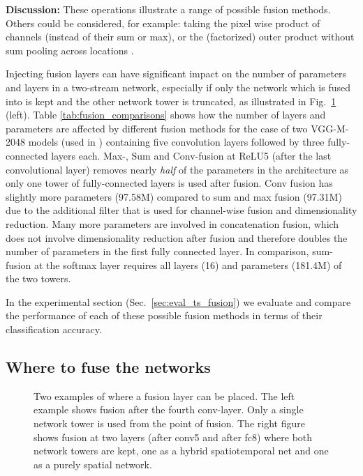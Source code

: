 \documentclass[10pt,twocolumn,letterpaper]{article}
\begin{document}
\textbf{Discussion:} These operations illustrate a range of possible fusion methods. Others could be considered, for example: taking the pixel wise
product of channels (instead of their sum or max), or the (factorized) outer product without sum pooling across locations \cite{Oh15}. 

Injecting fusion layers can have significant impact on the number of parameters
and layers in a two-stream network, especially if only the network
which is fused into is kept and the other network tower is truncated, 
as illustrated in Fig.~\ref{fig:where_to_fuse} (left).
Table \ref{tab:fusion_comparisons} shows how the number of layers and
parameters are affected by different fusion methods for the case of
two VGG-M-2048 models (used in \cite{Simonyan14b}) containing five
convolution layers followed by three fully-connected layers each.
Max-, Sum and Conv-fusion at ReLU5 (after the last convolutional layer)
removes nearly {\em half} of the parameters in the
architecture as only one tower of fully-connected layers is used after
fusion. Conv fusion has slightly more parameters (97.58M) compared to
sum and max fusion (97.31M) due to the additional filter that is used
for channel-wise fusion and dimensionality reduction. Many more
parameters are involved in concatenation fusion, which does not
involve dimensionality reduction after fusion and therefore doubles
the number of parameters in the first fully connected layer. In
comparison, sum-fusion at the softmax layer requires all layers (16)
and parameters (181.4M) of the two towers.

In the experimental section (Sec.~\ref{sec:eval_ts_fusion}) we
evaluate and compare the performance of each of these possible fusion
methods in terms of their classification accuracy.




\subsection{Where to fuse the networks} \label{sec:whereToFuse}
\begin{figure}[!h]
	\centering
	\vspace{-5pt}
	\caption{Two examples of where a fusion layer can be placed. The left example
		shows fusion after the fourth conv-layer. Only a single network tower
		is used from the point of fusion.
		The right figure shows fusion at two layers (after conv5
		and after fc8) where both network towers are kept, one as a hybrid
		spatiotemporal net and one as a purely spatial network.  }
	\label{fig:where_to_fuse}
	\vspace{-15pt}
\end{figure}
\end{document}
